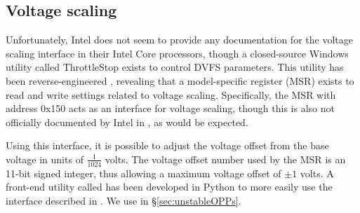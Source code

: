 \subsection{Voltage scaling}

Unfortunately, Intel does not seem to provide any documentation for the voltage
scaling interface in their Intel Core processors, though a closed-source
Windows utility called ThrottleStop \cite{throttlestop} exists to control DVFS
parameters. This utility has been reverse-engineered \cite{elersicDoc},
revealing that a model-specific register (MSR) exists to read and write settings
related to voltage scaling. Specifically, the MSR with address 0x150 acts as an
interface for voltage scaling, though this is also not officially documented by
Intel in \cite[Volume 4, §2.13]{intelDevManual}, as would be expected.

Using this interface, it is possible to adjust the voltage offset from the base
voltage in units of $\frac{1}{1024}$ volts. The voltage offset number used by
the MSR is an 11-bit signed integer, thus allowing a maximum voltage offset of
$\pm{1}$ volts. A front-end utility called  \cite{whewellUndervolt}
has been developed in Python to more easily use the interface described in
\cite{elersicDoc}. We use  in §\ref{sec:unstableOPPs}.
